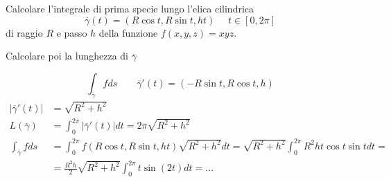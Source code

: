 \begin{exbar}
\begin{example}
	Calcolare l'integrale di prima specie lungo l'elica cilindrica 
	\begin{equation*}
		\overline{\gamma}(t)=(R \cos t , R \sin t , h t)\,\,\,\,\,\,\,\,t \in [0,2\pi]
	\end{equation*}
	di raggio $R$ e passo $h$ della funzione $f(x,y,z)=xyz$.
	
	Calcolare poi la lunghezza di $\overline{\gamma}$
	
	$$\int_{\overline{\gamma}} f ds \qquad \overline{\gamma}'(t)=(-R\sin t , R \cos t , h)$$
	\begin{align*} 
		|\overline{\gamma}'(t)| &=\sqrt{R^2+h^2}
		\\
		L(\overline{\gamma}) &=\int_0^{2\pi}|\overline{\gamma}'(t)|dt=2\pi \sqrt{R^2+h^2}
		\\
		\int_{\overline{\gamma}} f ds &= \int_0^{2\pi} f(R \cos t , R \sin t , h t)\sqrt{R^2 +h^2} dt= \sqrt{R^2 + h^2} \int_0^{2\pi} R^2h t \cos t \sin t dt =
		\\
		&= \frac{ R^2 h}{2}\sqrt{R^2+h^2}\int_0^{2\pi}t \sin (2t)dt=...
	\end{align*}
\end{example}
\end{exbar}



